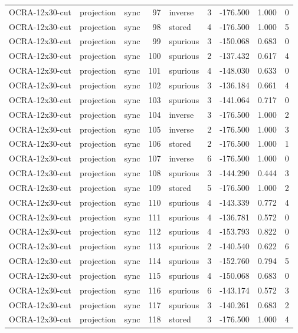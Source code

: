 \begin{tabular}{lllrlrrrr}
OCRA-12x30-cut & projection & sync & 97 & inverse & 3 & -176.500 & 1.000 & 0 \\
OCRA-12x30-cut & projection & sync & 98 & stored & 4 & -176.500 & 1.000 & 5 \\
OCRA-12x30-cut & projection & sync & 99 & spurious & 3 & -150.068 & 0.683 & 0 \\
OCRA-12x30-cut & projection & sync & 100 & spurious & 2 & -137.432 & 0.617 & 4 \\
OCRA-12x30-cut & projection & sync & 101 & spurious & 4 & -148.030 & 0.633 & 0 \\
OCRA-12x30-cut & projection & sync & 102 & spurious & 3 & -136.184 & 0.661 & 4 \\
OCRA-12x30-cut & projection & sync & 103 & spurious & 3 & -141.064 & 0.717 & 0 \\
OCRA-12x30-cut & projection & sync & 104 & inverse & 3 & -176.500 & 1.000 & 2 \\
OCRA-12x30-cut & projection & sync & 105 & inverse & 2 & -176.500 & 1.000 & 3 \\
OCRA-12x30-cut & projection & sync & 106 & stored & 2 & -176.500 & 1.000 & 1 \\
OCRA-12x30-cut & projection & sync & 107 & inverse & 6 & -176.500 & 1.000 & 0 \\
OCRA-12x30-cut & projection & sync & 108 & spurious & 3 & -144.290 & 0.444 & 3 \\
OCRA-12x30-cut & projection & sync & 109 & stored & 5 & -176.500 & 1.000 & 2 \\
OCRA-12x30-cut & projection & sync & 110 & spurious & 4 & -143.339 & 0.772 & 4 \\
OCRA-12x30-cut & projection & sync & 111 & spurious & 4 & -136.781 & 0.572 & 0 \\
OCRA-12x30-cut & projection & sync & 112 & spurious & 4 & -153.793 & 0.822 & 0 \\
OCRA-12x30-cut & projection & sync & 113 & spurious & 2 & -140.540 & 0.622 & 6 \\
OCRA-12x30-cut & projection & sync & 114 & spurious & 3 & -152.760 & 0.794 & 5 \\
OCRA-12x30-cut & projection & sync & 115 & spurious & 4 & -150.068 & 0.683 & 0 \\
OCRA-12x30-cut & projection & sync & 116 & spurious & 6 & -143.174 & 0.572 & 3 \\
OCRA-12x30-cut & projection & sync & 117 & spurious & 3 & -140.261 & 0.683 & 2 \\
OCRA-12x30-cut & projection & sync & 118 & stored & 3 & -176.500 & 1.000 & 4 \\

\end{tabular}
